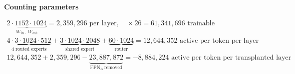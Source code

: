 \documentclass[border=40pt]{standalone}
\begin{document}
\begin{minipage}{26cm}
{\sffamily\bfseries\Large\color{muted} Counting parameters}\par\vspace{-14pt}
{\LARGE
\begin{gather*}
\underbrace{2\cdot 1152\cdot 1024}_{W_{in},\;W_{out}} = 2{,}359{,}296 \text{ per layer}, \quad \times 26 = 61{,}341{,}696 \text{ trainable}
\\[6pt]
\underbrace{4\cdot 3\cdot 1024\cdot 512}_{\text{4 routed experts}} + \underbrace{3\cdot 1024\cdot 2048}_{\text{shared expert}}
+ \underbrace{60\cdot 1024}_{\text{router}} = 12{,}644{,}352 \text{ active per token per layer}
\\[6pt]
12{,}644{,}352 + 2{,}359{,}296 - \underbrace{23{,}887{,}872}_{\mathrm{FFN}_A\ \text{removed}} = -8{,}884{,}224 \text{ active per token per transplanted layer}
\end{gather*}}
\end{minipage}
\end{document}
